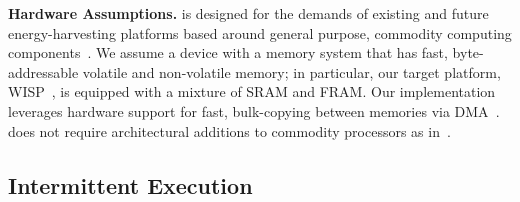 \textbf{Hardware Assumptions.} \sys is designed for the demands of existing and
future energy-harvesting platforms based around general purpose, commodity
computing components~\cite{wisp,msp430datasheet}. We assume a device with a
memory system that has fast, byte-addressable volatile and non-volatile memory;
in particular, our target platform, WISP~\cite{wisp}, is equipped with a
mixture of SRAM and FRAM. Our implementation leverages hardware support for
fast, bulk-copying between memories via DMA~\cite{msp430datasheet}. \sys does not
require architectural additions to commodity processors as
in~\cite{su_date_2017,hicks_isca_2017,quickrecall,nvp}.

\subsection{Intermittent Execution}
\label{sec:background_consistency}

